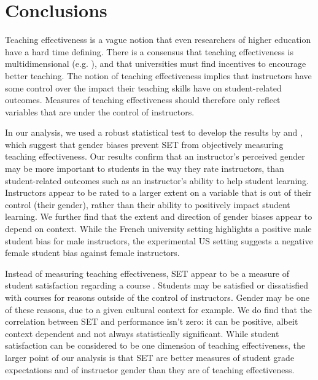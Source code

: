 \documentclass[12pt]{article}
\newcommand{\todo}[1]{{\color{red}{TO DO: \sc #1}}}
\begin{document}
\section{Conclusions}


Teaching effectiveness is a vague notion that even researchers of higher education have a hard time defining. There is a consensus that teaching effectiveness is multidimensional (e.g. \citep{Marsh1997}), and that universities must find incentives to encourage better teaching. The notion of teaching effectiveness implies that instructors have some control over the impact their teaching skills have on student-related outcomes. Measures of teaching effectiveness should therefore only reflect variables that are under the control of instructors. 

In our analysis, we used a robust statistical test to develop the results by \citet{Boring2015} and \citet{MacNell2014}, which suggest that gender biases prevent SET from objectively measuring teaching effectiveness. Our results confirm that an instructor's perceived gender may be more important to students in the way they rate instructors, than student-related outcomes such as an instructor's ability to help student learning. Instructors appear to be rated to a larger extent on a variable that is out of their control (their gender), rather than their ability to positively impact student learning. We further find that the extent and direction of gender biases appear to depend on context. While the French university setting highlights a positive male student bias for male instructors, the experimental US setting suggests a negative female student bias against female instructors.

Instead of measuring teaching effectiveness, SET appear to be a measure of student satisfaction regarding a course \citep{StarkFreishtat2014}. Students may be satisfied or dissatisfied with courses for reasons outside of the control of instructors. Gender may be one of these reasons, due to a given cultural context for example. We do find that the correlation between SET and performance isn't zero:
it can be positive, albeit context dependent and not always statistically significant. While student satisfaction can be considered to be one dimension of teaching effectiveness, the larger point of our analysis is that SET are better measures of student grade expectations and of instructor gender than they are of teaching effectiveness.    
\end{document}
